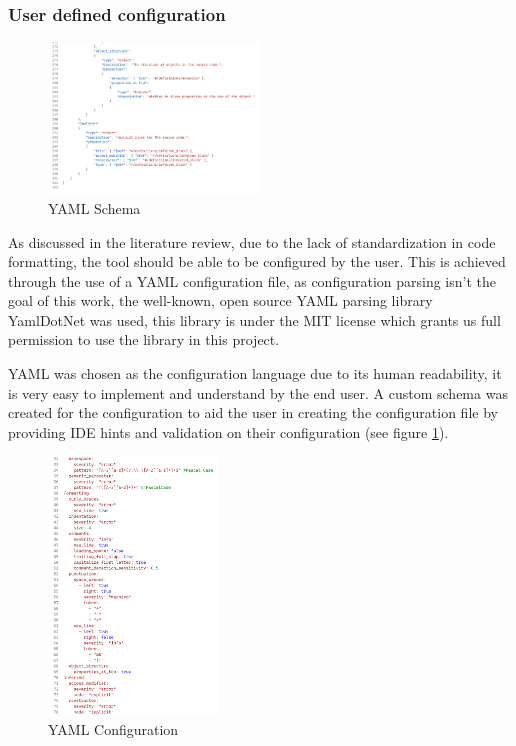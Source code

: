 \subsubsection{User defined configuration}

\begin{figure}
    \centering
    \caption{YAML Schema}
    \label{fig:YAMLSchema}
    \includegraphics[width=0.5\textwidth]{Figures/YAMLSchemaCropped.png}
\end{figure}

As discussed in the literature review, due to the lack of standardization in code formatting, the tool should be able to be configured by the user. This is achieved through the use of a YAML configuration file, as configuration parsing isn't the goal of this work, the well-known, open source YAML parsing library YamlDotNet was used, this library is under the MIT license which grants us full permission to use the library in this project.

YAML was chosen as the configuration language due to its human readability, it is very easy to implement and understand by the end user. A custom schema was created for the configuration to aid the user in creating the configuration file by providing IDE hints and validation on their configuration (see figure \ref{fig:YAMLSchema}).

\begin{figure}
    \centering
    \caption{YAML Configuration}
    \label{fig:YAMLConfiguration}
    \includegraphics[width=0.4\textwidth]{Figures/YAMLConfigurationCropped.png}
\end{figure}

